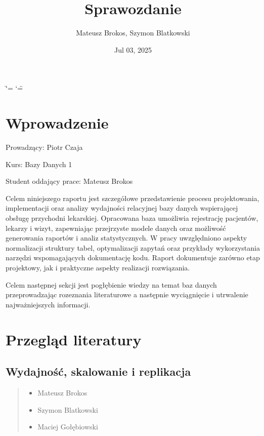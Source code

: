 \documentclass[a4paper,11pt,openany,english]{sphinxmanual}
\title{Sprawozdanie}
\date{Jul 03, 2025}
\author{Mateusz Brokos, Szymon Blatkowski}
\begin{document}
\ifdefined\shorthandoff
  \ifnum\catcode`\=\string=\active\shorthandoff{=}\fi
  \ifnum\catcode`\"=\active{}\fi
\fi

\pagestyle{empty}
\sphinxmaketitle
\pagestyle{plain}
\tableofcontents
\pagestyle{normal}
\label{\detokenize{index::doc}}


\sphinxstepscope


\chapter{Wprowadzenie}
\label{\detokenize{rozdzial1/index:wprowadzenie}}\label{\detokenize{rozdzial1/index::doc}}
\sphinxAtStartPar
Prowadzący: Piotr Czaja

\sphinxAtStartPar
Kurs: Bazy Danych 1

\sphinxAtStartPar
Student oddający prace: Mateusz Brokos

\sphinxAtStartPar
Celem niniejszego raportu jest szczegółowe przedstawienie procesu projektowania, implementacji oraz analizy wydajności relacyjnej bazy danych wspierającej obsługę przychodni lekarskiej. Opracowana baza umożliwia rejestrację pacjentów, lekarzy i wizyt, zapewniając przejrzyste modele danych oraz możliwość generowania raportów i analiz statystycznych. W pracy uwzględniono aspekty normalizacji struktury tabel, optymalizacji zapytań oraz przykłady wykorzystania narzędzi wspomagających dokumentację kodu. Raport dokumentuje zarówno etap projektowy, jak i praktyczne aspekty realizacji rozwiązania.

\sphinxAtStartPar
Celem następnej sekcji jest pogłębienie wiedzy na temat baz danych przeprowadzając rozeznania literaturowe a następnie wyciągnięcie i utrwalenie najważniejszych informacji.

\sphinxstepscope


\chapter{Przegląd literatury}
\label{\detokenize{rozdzial2/index:przeglad-literatury}}\label{\detokenize{rozdzial2/index::doc}}

\section{Wydajność, skalowanie i replikacja}
\label{\detokenize{rozdzial2/index:wydajnosc-skalowanie-i-replikacja}}\begin{quote}\begin{description}
\begin{itemize}
\item {} 
\sphinxAtStartPar
Mateusz Brokos

\item {} 
\sphinxAtStartPar
Szymon Blatkowski

\item {} 
\sphinxAtStartPar
Maciej Gołębiowski

\end{itemize}

\end{description}\end{quote}
\end{document}
